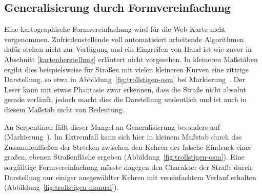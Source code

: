\documentclass[../main/thesis.tex]{subfiles}
\begin{document}
\FloatBarrier
\subsection{Generalisierung durch Formvereinfachung}

Eine kartographische Formvereinfachung wird für die Web-Karte nicht vorgenommen.
Zufriedenstellende voll automatisiert arbeitende Algorithmen dafür stehen nicht zur Verfügung und ein Eingreifen von Hand ist wie zuvor in Abschnitt \ref{kartenherstellung} erläutert nicht vorgesehen. 
In kleineren Maßstäben ergibt dies beispielsweise für Straßen mit vielen kleineren Kurven eine zittrige Darstellung, so etwa in Abbildung~\ref{fig:trollstigen-osm} bei Markierung~.
Der Leser kann mit etwas Phantasie zwar erkennen, dass die Straße nicht absolut gerade verläuft, jedoch macht dies die Darstellung undeutlich und ist auch in diesem Maßstab nicht von Bedeutung.


An Serpentinen fällt dieser Mangel an Generalisierung besonders auf (Markierung~).
Im Extremfall kann sich hier in kleinem Maßstab durch das Zusammenfließen der Strecken zwischen den Kehren der falsche Eindruck einer großen, ebenen Straßenfläche ergeben (Abbildung~\ref{fig:trollstigen-osm}).
Eine sorgfältige Formvereinfachung müsste dagegen den Charakter der Straße durch Darstellung nur einiger ausgewählter Kehren mit vereinfachtem Verlauf erhalten (Abbildung~\ref{fig:trollstigen-manual}).
\end{document}
